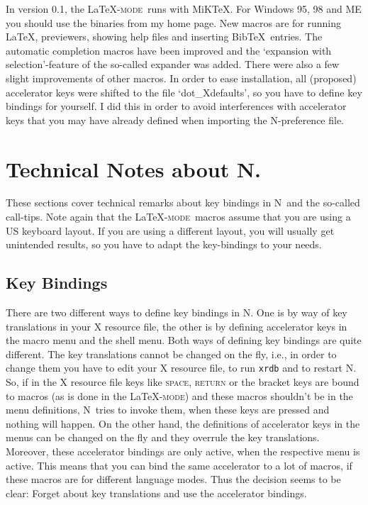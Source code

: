 \documentclass{article}
\newcommand{\latexpack}{\LaTeX-\textsc{mode}}
\newcommand{\nedit}{N\kern-0.8pt{Edit}}
\newcommand{\keyname}[1]{\textsc{#1}}
\begin{document}
In version 0.1, the \latexpack\ runs with MiK\TeX. For Windows 95, 98 and ME you should use the binaries from my home page. New macros are for running \LaTeX, previewers, showing help files and inserting Bib\TeX\ entries. The automatic completion macros have been improved and the `expansion with selection'-feature of the so-called expander was added. There were also a few slight improvements of other macros. In order to ease installation, all (proposed) accelerator keys were shifted to the file `dot\_Xdefaults', so you have to define key bindings for yourself. I did this in order to avoid interferences with accelerator keys that you may have already defined when importing the \nedit-preference file.

\newpage
\section{Technical Notes about \nedit.}
These sections cover technical remarks about key bindings in \nedit\ and the so-called call-tips. Note again that the \latexpack\ macros assume that you are using a US keyboard layout. If you are using a different layout, you will usually get unintended results, so you have to adapt the key-bindings to your needs.

\subsection{Key Bindings}\label{keys}
There are two different ways to define key bindings in \nedit. One is by way of key translations in your X resource file, the other is by defining accelerator keys in the macro menu and the shell menu. Both ways of defining key bindings are quite different. The key translations cannot be changed on the fly, i.e., in order to change them you have to edit your X resource file, to run \verb/xrdb/ and to restart \nedit. So, if in the X resource file keys like \keyname{space, return} or the bracket keys are bound to macros (as is done in the \latexpack) and these macros shouldn't be in the menu definitions, \nedit\ tries to invoke them, when these keys are pressed and nothing will happen. On the other hand, the definitions of accelerator keys in the menus can be changed on the fly and they overrule the key translations. Moreover, these accelerator bindings are only active, when the respective menu is active. This means that you can bind the same accelerator to a lot of macros, if these macros are for different language modes. Thus the decision seems to be clear: Forget about key translations and use the accelerator bindings.
\end{document}
